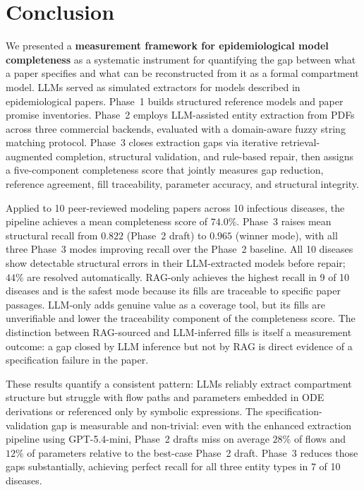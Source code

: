 

\section{Conclusion}
\label{sec:conclusion}

We presented a \textbf{measurement framework for epidemiological model completeness} as a
systematic instrument for quantifying the gap between what a paper specifies and what can be
reconstructed from it as a formal compartment model.
LLMs served as simulated extractors for models described in epidemiological papers.
Phase~1 builds structured reference models
and paper promise inventories. Phase~2 employs LLM-assisted entity extraction from PDFs
across three commercial backends, evaluated with a domain-aware fuzzy string matching
protocol. Phase~3 closes extraction gaps via iterative retrieval-augmented completion,
structural validation, and rule-based repair, then assigns a five-component completeness
score that jointly measures gap reduction, reference agreement, fill traceability,
parameter accuracy, and structural integrity.

Applied to 10 peer-reviewed modeling papers across 10 infectious diseases, the pipeline
achieves a mean completeness score of \textbf{$74.0\%$}. Phase~3 raises mean structural recall
from $0.822$ (Phase~2 draft) to $0.965$ (winner mode), with all three Phase~3 modes improving
recall over the Phase~2 baseline. All 10 diseases show detectable structural errors in
their LLM-extracted models before repair; $44\%$ are resolved automatically.
RAG-only achieves the highest recall in 9 of 10 diseases and is the safest mode because
its fills are traceable to specific paper passages. LLM-only adds genuine value as a
coverage tool, but its fills are unverifiable and lower the traceability component of
the completeness score. The distinction between RAG-sourced and LLM-inferred fills is
itself a measurement outcome: a gap closed by LLM inference but not by RAG is direct
evidence of a specification failure in the paper.

These results quantify a consistent pattern: LLMs reliably extract compartment structure
but struggle with flow paths and parameters embedded in ODE derivations or referenced
only by symbolic expressions. The specification-validation gap is measurable and
non-trivial: even with the enhanced extraction pipeline using GPT-5.4-mini, Phase~2 drafts
miss on average $28\%$ of flows and $12\%$ of parameters relative to the best-case
Phase~2 draft. Phase~3 reduces those gaps substantially, achieving perfect recall for
all three entity types in 7 of 10 diseases.

